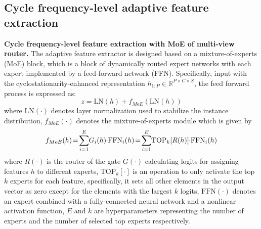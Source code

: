 \documentclass{article}
\begin{document}
	\subsection{Cycle frequency-level adaptive feature extraction}
	\textbf{Cycle frequency-level feature extraction with MoE of multi-view router.} The adaptive feature extractor is designed based on a mixture-of-experts (MoE) block, which is a block of dynamically routed expert networks with each expert implemented by a feed-forward network (FFN). Specifically, input with the cyclostationarity-enhanced representation $h_{1:P}\in\mathbb{R}^{P\times C\times S}$, the feed forward process is expressed as:
	\begin{equation}
		z=\mathrm{LN}\left(h\right)+f_{MoE}\left(\mathrm{LN}\left(h\right)\right)
	\end{equation}
	where $\mathrm{LN}\left(\cdot\right)$ denotes layer normalization used to stabilize the instance distribution, $f_{MoE}\left(\cdot\right)$ denotes the mixture-of-experts module which is given by
	\begin{equation}
		\setlength{\thinmuskip}{-1mu}
		\setlength{\medmuskip}{-1.5mu}
		f_{MoE}(h)\mkern-3mu=\mkern-3mu\sum_{i=1}^{E}G_{i}\!\left(h\right)\!\cdot\!\mathrm{FFN}_{i}\!\left(h\right)\mkern-3mu=\mkern-3mu\sum_{i=1}^{E}\mathrm{TOP}_{k}\!\left[R(h)\right]\!\cdot\!\mathrm{FFN}_{i}(h)
	\end{equation}
	where $R\left(\cdot\right)$ is the router of the gate $G\left(\cdot\right)$ calculating logits for assigning features $h$ to different experts, $\mathrm{TOP}_{k}[\cdot]$ is an operation to only activate the top $k$ experts for each feature, specifically, it sets all other elements in the output vector as zero except for the elements with the largest $k$ logits, $\mathrm{FFN}(\cdot)$ denotes an expert combined with a fully-connected neural network and a nonlinear activation function, $E$ and $k$ are hyperparameters representing the number of experts and the number of selected top experts respectively. 
	
\end{document}
